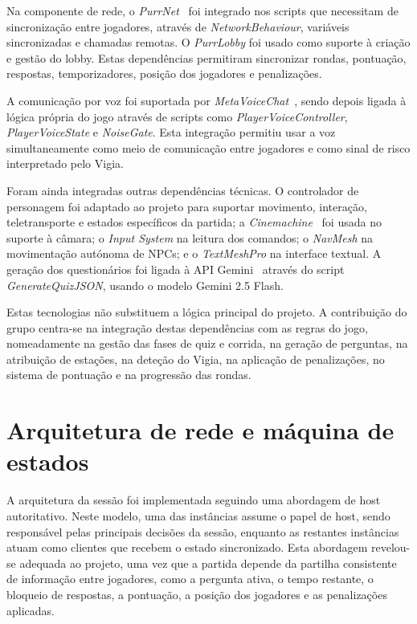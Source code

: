 Na componente de rede, o \textit{PurrNet}~\cite{PurrNet2026} foi integrado nos scripts que necessitam de sincronização entre jogadores, através de \textit{NetworkBehaviour}, variáveis sincronizadas e chamadas remotas. O \textit{PurrLobby} foi usado como suporte à criação e gestão do lobby. Estas dependências permitiram sincronizar rondas, pontuação, respostas, temporizadores, posição dos jogadores e penalizações.

A comunicação por voz foi suportada por \textit{MetaVoiceChat}~\cite{Metater2024}, sendo depois ligada à lógica própria do jogo através de scripts como \textit{PlayerVoiceController}, \textit{PlayerVoiceState} e \textit{NoiseGate}. Esta integração permitiu usar a voz simultaneamente como meio de comunicação entre jogadores e como sinal de risco interpretado pelo Vigia.

Foram ainda integradas outras dependências técnicas. O controlador de personagem foi adaptado ao projeto para suportar movimento, interação, teletransporte e estados específicos da partida; a \textit{Cinemachine}~\cite{UnityCinemachine2024} foi usada no suporte à câmara; o \textit{Input System} na leitura dos comandos; o \textit{NavMesh} na movimentação autónoma de NPCs; e o \textit{TextMeshPro} na interface textual. A geração dos questionários foi ligada à API Gemini~\cite{GoogleDeepMind2025} através do script \textit{GenerateQuizJSON}, usando o modelo Gemini 2.5 Flash.

Estas tecnologias não substituem a lógica principal do projeto. A contribuição do grupo centra-se na integração destas dependências com as regras do jogo, nomeadamente na gestão das fases de quiz e corrida, na geração de perguntas, na atribuição de estações, na deteção do Vigia, na aplicação de penalizações, no sistema de pontuação e na progressão das rondas.


\section{Arquitetura de rede e máquina de estados}
\label{sec:arquiteturaRede}

A arquitetura da sessão foi implementada seguindo uma abordagem de host autoritativo. Neste modelo, uma das instâncias assume o papel de host, sendo responsável pelas principais decisões da sessão, enquanto as restantes instâncias atuam como clientes que recebem o estado sincronizado. Esta abordagem revelou-se adequada ao projeto, uma vez que a partida depende da partilha consistente de informação entre jogadores, como a pergunta ativa, o tempo restante, o bloqueio de respostas, a pontuação, a posição dos jogadores e as penalizações aplicadas.

